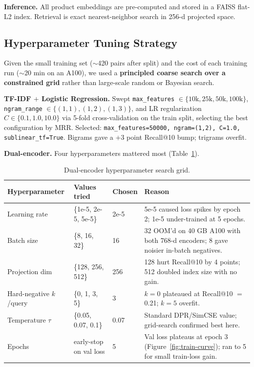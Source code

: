 \documentclass[11pt]{article}
\begin{document}
\textbf{Inference.} All product embeddings are pre-computed and stored in a FAISS flat-L2 index. Retrieval is exact nearest-neighbor search in 256-d projected space.

\subsection{Hyperparameter Tuning Strategy}

Given the small training set ($\sim$420 pairs after split) and the cost of each training run ($\sim$20 min on an A100), we used a \textbf{principled coarse search over a constrained grid} rather than large-scale random or Bayesian search.

\textbf{TF-IDF $+$ Logistic Regression.} Swept \texttt{max\_features} $\in \{10\text{k}, 25\text{k}, 50\text{k}, 100\text{k}\}$, \texttt{ngram\_range} $\in \{(1,1),(1,2),(1,3)\}$, and LR regularization $C \in \{0.1, 1.0, 10.0\}$ via 5-fold cross-validation on the train split, selecting the best configuration by MRR. Selected: \texttt{max\_features=50000, ngram=(1,2), C=1.0, sublinear\_tf=True}. Bigrams gave a $+3$ point Recall@10 bump; trigrams overfit.

\textbf{Dual-encoder.} Four hyperparameters mattered most (Table~\ref{tab:hyperparams}).

\begin{table}[h]
\centering
\caption{Dual-encoder hyperparameter search grid.}
\label{tab:hyperparams}
\small
\begin{tabular}{p{3.2cm}p{3.2cm}p{1.4cm}p{6cm}}
\toprule
\textbf{Hyperparameter} & \textbf{Values tried} & \textbf{Chosen} & \textbf{Reason} \\
\midrule
Learning rate & \{1e-5, 2e-5, 5e-5\} & 2e-5 & 5e-5 caused loss spikes by epoch 2; 1e-5 under-trained at 5 epochs. \\
Batch size & \{8, 16, 32\} & 16 & 32 OOM'd on 40 GB A100 with both 768-d encoders; 8 gave noisier in-batch negatives. \\
Projection dim & \{128, 256, 512\} & 256 & 128 hurt Recall@10 by 4 points; 512 doubled index size with no gain. \\
Hard-negative $k$/query & \{0, 1, 3, 5\} & 3 & $k{=}0$ plateaued at Recall@10 $=$ 0.21; $k{=}5$ overfit. \\
Temperature $\tau$ & \{0.05, 0.07, 0.1\} & 0.07 & Standard DPR/SimCSE value; grid-search confirmed best here. \\
Epochs & early-stop on val loss & 5 & Val loss plateaus at epoch 3 (Figure~\ref{fig:train-curve}); ran to 5 for small train-loss gain. \\
\bottomrule
\end{tabular}
\end{table}
\end{document}
